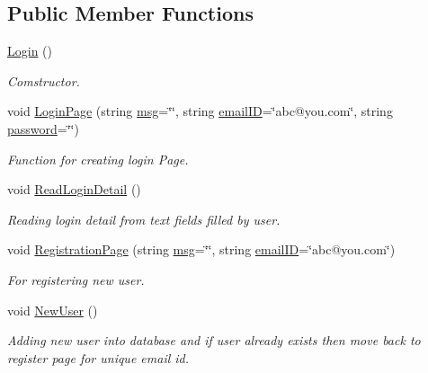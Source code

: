 \subsection*{\-Public \-Member \-Functions}
\begin{DoxyCompactItemize}
\item 
\hyperlink{classLogin_a4847f3e07e43b540d3339392346f87ff}{\-Login} ()
\begin{DoxyCompactList}\small\item\em \-Comstructor. \end{DoxyCompactList}\item 
void \hyperlink{classLogin_a2b2b36f506bcb5e7179b0b3afe164ace}{\-Login\-Page} (string \hyperlink{classInputDetail_a1abb16cd695678c3fa05e3c812823fee}{msg}=\char`\"{}\char`\"{}, string \hyperlink{classLogin_abea56d6d6403f1e627294f222dd77310}{email\-I\-D}=\char`\"{}abc@you.\-com\char`\"{}, string \hyperlink{classLogin_a39f7fd03b2b27c927c657ee73e7fcbbc}{password}=\char`\"{}\char`\"{})
\begin{DoxyCompactList}\small\item\em \-Function for creating login \-Page. \end{DoxyCompactList}\item 
void \hyperlink{classLogin_ab5bc65de431f277f15a3b423ad915808}{\-Read\-Login\-Detail} ()
\begin{DoxyCompactList}\small\item\em \-Reading login detail from text fields filled by user. \end{DoxyCompactList}\item 
void \hyperlink{classLogin_a3f4e5e4087c007e8e605849778881b39}{\-Registration\-Page} (string \hyperlink{classInputDetail_a1abb16cd695678c3fa05e3c812823fee}{msg}=\char`\"{}\char`\"{}, string \hyperlink{classLogin_abea56d6d6403f1e627294f222dd77310}{email\-I\-D}=\char`\"{}abc@you.\-com\char`\"{})
\begin{DoxyCompactList}\small\item\em \-For registering new user. \end{DoxyCompactList}\item 
void \hyperlink{classLogin_ae4f139afcb706f09b337befd123d5e18}{\-New\-User} ()
\begin{DoxyCompactList}\small\item\em \-Adding new user into database and if user already exists then move back to register page for unique email id. \end{DoxyCompactList}\item 

\end{DoxyCompactItemize}
